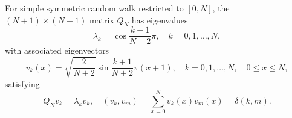 For simple symmetric random walk restricted to $[0,N]$, the $(N+1) \times (N+1)$ matrix $Q_N$ has eigenvalues
$$\lambda_k = \cos \frac{k+1}{N+2} \pi, \quad k = 0, 1, \ldots, N,$$
with associated eigenvectors
$$v_k(x) = \sqrt{\frac{2}{N+2}} \sin \frac{k+1}{N+2} \pi (x+1), \quad k = 0, 1, \ldots, N, \quad 0 \leq x \leq N,$$
satisfying
$$Q_N v_k = \lambda_k v_k, \quad (v_k, v_m) = \sum_{x=0}^{N} v_k(x) v_m(x) = \delta(k,m).$$
